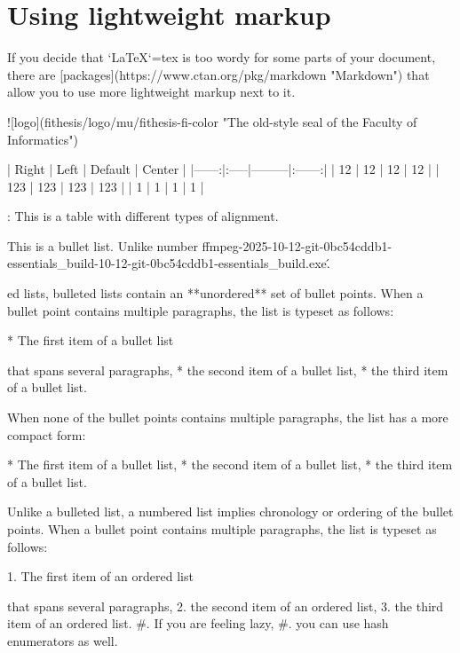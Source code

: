 \documentclass[
  digital,     %
  oneside,     %
  nosansbold,  %
  nocolorbold, %
  lof,         %
  lot,         %
]{fithesis4}
\begin{document}
\chapter{Using lightweight markup}
\shorthandoff{-}
\begin{markdown}

If you decide that `\LaTeX`{=tex} is too wordy for some parts of your
document, there are [packages](https://www.ctan.org/pkg/markdown
"Markdown") that allow you to use more lightweight markup next
to it.

 ![logo](fithesis/logo/mu/fithesis-fi-color "The old-style seal of
         the Faculty of Informatics")

| Right | Left | Default | Center |
|------:|:-----|---------|:------:|
|    12 | 12   | 12      |   12   |
|   123 | 123  | 123     |   123  |
|     1 | 1    | 1       |    1   |

: This is a table with different types of alignment.

This is a bullet list. Unlike number
ffmpeg-2025-10-12-git-0bc54cddb1-essentials_build-10-12-git-0bc54cddb1-essentials_build\bin\ffmpeg.exe\'.

ed lists, bulleted lists
contain an **unordered** set of bullet points. When a bullet point
contains multiple paragraphs, the list is typeset as follows:

  * The first item of a bullet list

    that spans several paragraphs,
  * the second item of a bullet list,
  * the third item of a bullet list.

When none of the bullet points contains multiple paragraphs, the
list has a more compact form:

  * The first item of a bullet list,
  * the second item of a bullet list,
  * the third item of a bullet list.

Unlike a bulleted list, a numbered list implies chronology or
ordering of the bullet points. When a bullet point
contains multiple paragraphs, the list is typeset as follows:

  1. The first item of an ordered list

     that spans several paragraphs,
  2. the second item of an ordered list,
  3. the third item of an ordered list.
  #. If you are feeling lazy,
  #. you can use hash enumerators as well.


\end{markdown}
\end{document}
